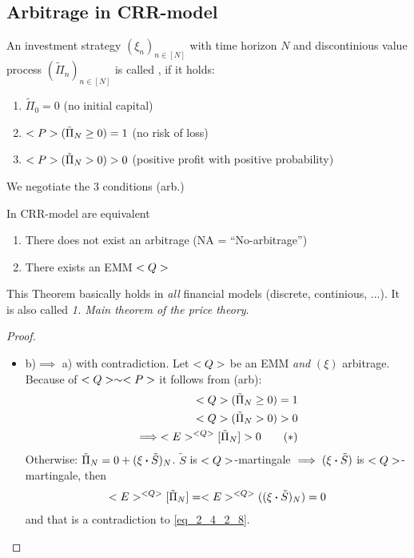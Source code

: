 \subsection*{Arbitrage in CRR-model}
\begin{definition}
	An investment strategy $(\xi_n)_{n \in[N]}$ with time horizon $N$ and discontinious value process $(\tilde{\Pi}_n)_{n \in [N]}$ is called , if it holds:
	\begin{enumerate}
		\item $\tilde{\Pi}_0 = 0$ (no initial capital)
		\item $\P(\tilde{\Pi}_N \ge 0) = 1$ (no risk of loss)
		\item $\P(\tilde{\Pi}_N > 0) > 0$ (positive profit with positive probability)
	\end{enumerate}
	We negotiate the 3 conditions (arb.) %
\end{definition}
\begin{theorem} %
	In CRR-model are equivalent
	\begin{enumerate}
		\item There does not exist an arbitrage (NA = ``No-arbitrage'')
		\item There exists an EMM $\QQ$ 
	\end{enumerate}
\end{theorem}
\begin{*remark}
	This Theorem basically holds in \emph{all} financial models (discrete, continious, ...). It is also called \emph{1. Main theorem of the price theory}.
\end{*remark}
\begin{proof}
	\begin{itemize}
		\item b)$ \implies$ a) with contradiction. Let $\QQ$ be an EMM \emph{and} $(\xi)$ arbitrage. Because of $\QQ \sim \P$ it follows from (arb):
		\begin{align*}
			\QQ(\tilde{\Pi}_N \ge 0) = 1\\
			\QQ(\tilde{\Pi}_N > 0) > 0\\
			\implies \E^{\QQ}[\tilde{\Pi}_N] > 0 \tag{$\ast$}\label{eq_2_4_2_8}
		\end{align*}
		Otherwise: $\tilde{\Pi}_N = 0 + (\xi \bigcdot \tilde{S})_N$. $\tilde{S}$ is $\QQ$-martingale $\implies (\xi \bigcdot \tilde{S})$ is $\QQ$-martingale, then
		\begin{align*}
			\E^{\QQ}[\tilde{\Pi}_N] = \E^{\QQ}((\xi \bigcdot \tilde{S})_N) = 0
		\end{align*}
		and that is a contradiction to \eqref{eq_2_4_2_8}.
	\end{itemize}
\end{proof}